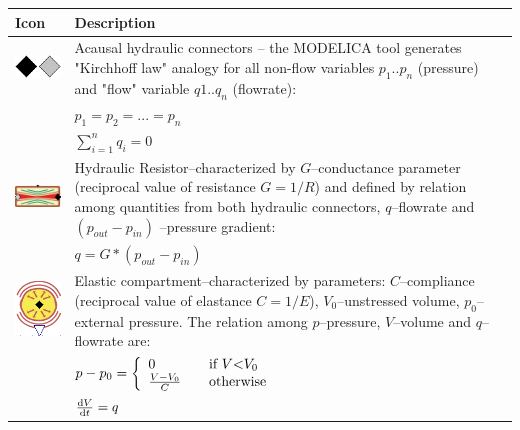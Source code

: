 \begin{table}[!ht]
\small
\centering
\begin{tabular}{m{1.0cm} m{10.2cm}}
\hline
Icon & Description \\
\hline
\includegraphics[scale=0.8]{HydraulicPorts.png} & Acausal hydraulic connectors -- the MODELICA tool generates "Kirchhoff law" analogy for all non-flow variables $p_1 .. p_n$ (pressure) and "flow" variable $q1..q_n$ (flowrate):\\
 & $ \label{eq:con1} p_1 = p_2 =... = p_n$ \\
 & $ \label{eq:con2} \sum_{i=1}^{n} q_i = 0$  \\
\hline
\includegraphics[scale=0.4]{resistance.png} & Hydraulic Resistor--characterized by $G$--conductance parameter (reciprocal value of resistance $G = 1/R$) and defined by relation among quantities from both hydraulic connectors, $q$--flowrate and $(p_{out} - p_{in})$ --pressure gradient:\\ 
 & $ \label{eq:resistor} q = G *(p_{out} - p_{in}) $ \\ \hline
\includegraphics[scale=0.4]{elasticity.png} & Elastic compartment--characterized by parameters: $C$--compliance (reciprocal value of elastance $C=1/E$), $V_0$--unstressed volume, $p_0$--external pressure. The relation among $p$--pressure, $V$--volume and $q$--flowrate are:\\ 
& $ \label{eq:compliance}p-p_0 = \left\{   
  \begin{array}{l l} 0 & \quad \text{if } V \text{\textless} V_0 \\ 
    \frac{V-V_0}{C} & \quad \text{otherwise}
  \end{array} \right.$ \\
 & $ \label{eq:flowrate}\frac{{\rm d}V}{{\rm d}t} =  q$ \\ 

\end{tabular}
\end{table}
